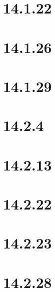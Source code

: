 \documentclass{report}
\begin{document}
\section*{14.1.22}
\section*{14.1.26}
\section*{14.1.29}
\section*{14.2.4}
\section*{14.2.13}
\section*{14.2.22}
\section*{14.2.23}
\section*{14.2.28}
\end{document}
